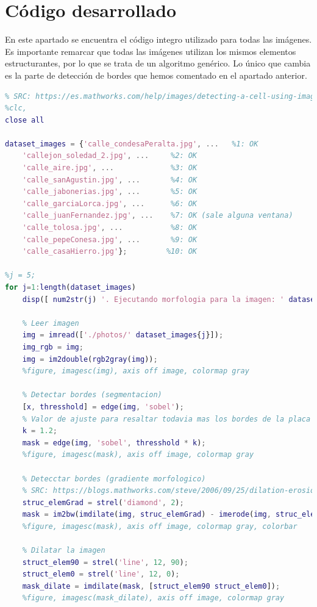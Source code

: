 \documentclass[12pt]{article}
\begin{document}
	\pagebreak
	
\section{Código desarrollado}
\label{section: codigo}
\noindent En este apartado se encuentra el código integro utilizado para todas las imágenes. Es importante remarcar que todas las imágenes utilizan los mismos elementos estructurantes, por lo que se trata de un algoritmo genérico. Lo único que cambia es la parte de detección de bordes que hemos comentado en el apartado anterior.

\begin{lstlisting}[language=matlab, caption={Código implementado para segmentación y OCR de carteles de calles, utilizando morfología matemática}]
%% Detectar placas de calles
% SRC: https://es.mathworks.com/help/images/detecting-a-cell-using-image-segmentation.html
%clc,
close all

dataset_images = {'calle_condesaPeralta.jpg', ...   %1: OK
	'callejon_soledad_2.jpg', ...     %2: OK
	'calle_aire.jpg', ...             %3: OK
	'calle_sanAgustin.jpg', ...       %4: OK 
	'calle_jabonerias.jpg', ...       %5: OK
	'calle_garciaLorca.jpg', ...      %6: OK
	'calle_juanFernandez.jpg', ...    %7: OK (sale alguna ventana)
	'calle_tolosa.jpg', ...           %8: OK
	'calle_pepeConesa.jpg', ...       %9: OK
	'calle_casaHierro.jpg'};         %10: OK

%j = 5;
for j=1:length(dataset_images) 
	disp([ num2str(j) '. Ejecutando morfologia para la imagen: ' dataset_images{j}])

	% Leer imagen
	img = imread(['./photos/' dataset_images{j}]);
	img_rgb = img;
	img = im2double(rgb2gray(img));
	%figure, imagesc(img), axis off image, colormap gray

	% Detectar bordes (segmentacion)
	[x, thresshold] = edge(img, 'sobel');
	% Valor de ajuste para resaltar todavia mas los bordes de la placa
	k = 1.2;  
	mask = edge(img, 'sobel', thresshold * k);
	%figure, imagesc(mask), axis off image, colormap gray

	% Detecctar bordes (gradiente morfologico)
	% SRC: https://blogs.mathworks.com/steve/2006/09/25/dilation-erosion-and-the-morphological-gradient/
	struc_elemGrad = strel('diamond', 2);
	mask = im2bw(imdilate(img, struc_elemGrad) - imerode(img, struc_elemGrad));
	%figure, imagesc(mask), axis off image, colormap gray, colorbar

	% Dilatar la imagen
	struct_elem90 = strel('line', 12, 90);
	struct_elem0 = strel('line', 12, 0);
	mask_dilate = imdilate(mask, [struct_elem90 struct_elem0]);
	%figure, imagesc(mask_dilate), axis off image, colormap gray


\end{lstlisting}
\end{document}
